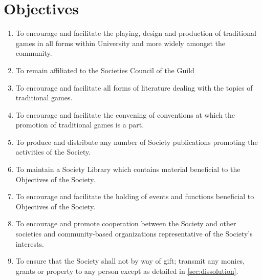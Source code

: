 \documentclass[a4paper]{article}
\begin{document}
\section{Objectives} \label{sec:objectives}
\begin{enumerate}
    \item To encourage and facilitate the playing, design and production of traditional games in all forms within University and more widely amongst the community.
    \item To remain affiliated to the Societies Council of the Guild
    \item To encourage and facilitate all forms of literature dealing with the topics of traditional games.
    \item To encourage and facilitate the convening of conventions at which the promotion of traditional games is a part.
    \item To produce and distribute any number of Society publications promoting the activities of the Society.
    \item To maintain a Society Library which contains material beneficial to the Objectives of the Society.
    \item To encourage and facilitate the holding of events and functions beneficial to Objectives of the Society.
    \item To encourage and promote cooperation between the Society and other societies and community-based organizations representative of the Society's interests.
    \item To ensure that the Society shall not by way of gift; transmit any monies, grants or property to any person except as detailed in \cref{sec:dissolution}.
\end{enumerate}
\end{document}
